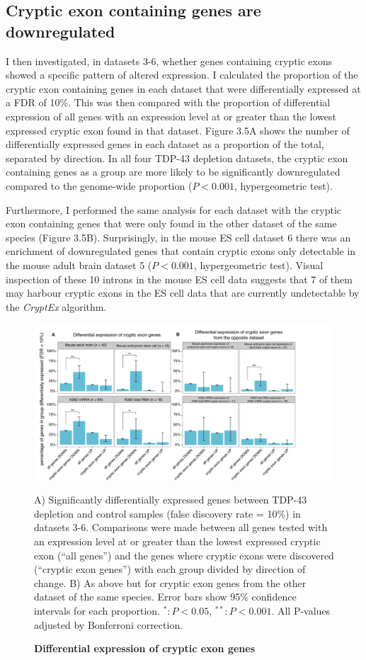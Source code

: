 \subsection{Cryptic exon containing genes are downregulated}
I then investigated, in datasets 3-6, whether genes containing cryptic exons showed a specific pattern of altered expression. I calculated the proportion of the cryptic exon containing genes in each dataset that were differentially expressed at a FDR of 10\%. This was then compared with the proportion of differential expression of all genes with an expression level at or greater than the lowest expressed cryptic exon found in that dataset. Figure 3.5A shows the number of differentially expressed genes in each dataset as a proportion of the total, separated by direction. In all four TDP-43 depletion datasets, the cryptic exon containing genes as a group are more likely to be significantly downregulated compared to the genome-wide proportion ($P < 0.001$, hypergeometric test).

Furthermore, I performed the same analysis for each dataset with the cryptic exon containing genes that were only found in the other dataset of the same species (Figure 3.5B). Surprisingly, in the mouse ES cell dataset 6 there was an enrichment of downregulated genes that contain cryptic exons only detectable in the mouse adult brain dataset 5 ($P < 0.001$, hypergeometric test). Visual inspection of these 10 introns in the mouse ES cell data suggests that 7 of them may harbour cryptic exons in the ES cell data that are currently undetectable by the \emph{CryptEx} algorithm.

\begin{figure}[h!]
	\centering
	\includegraphics[width=\textwidth]{Figures/03_cryptic_exons/Figure_5_Gene_Expression.png}
	\caption{\textbf{Differential expression of cryptic exon genes}}
		A) Significantly differentially expressed genes between TDP-43 depletion and control samples (false discovery rate = 10\%) in datasets 3-6. Comparisons were made between all genes tested with an expression level at or greater than the lowest expressed cryptic exon (``all genes'') and the genes where cryptic exons were discovered (``cryptic exon genes'') with each group divided by direction of change. B) As above but for cryptic exon genes from the other dataset of the same species. Error bars show 95\% confidence intervals for each proportion. $^* : P < 0.05$, $^{**} : P < 0.001$. All P-values adjusted by Bonferroni correction.
	\label{fig:cryptic_expression}
\end{figure}

